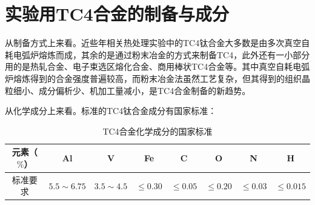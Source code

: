 \documentclass[
class = book,
zihao = -4,
font = noto,
paper = a4paper,
openany
]{easybook}
\begin{document}
\section{实验用TC4合金的制备与成分}
从制备方式上来看。近些年相关热处理实验中的TC4钛合金大多数是由{多次真空自耗电弧炉熔炼}\cite{renchiqiangGurongshixiaoduiTC4taihejinxianweizuzhihelixuexingnengdeyingxiang2022,ranxingGurongwenduduiTi6Al4VELItaihejinxianweizuzhijixingnengdeyingxiang2021,lilouGurongshixiaoduiTC4hejinzuzhiyujixiexingnengdeyingxiang2014,jingranGurongshixiaoduiTC4hejinzuzhiyuxingnengdeyingxiang2018}而成，其余的是通过粉末冶金\cite{zhanghaoyinGurongShixiaoduiTC4taihejinzuzhihelixuexingnengdeyingxiang2014,xujianGurongshixiaogongyiduiTC4taihejinzuzhijixingnengdeyingxiang2014}的方式来制备TC4，此外还有一小部分用的是热轧合金\cite{LiuWanYingBuTongReChuLiGongYiDuiTi6Al4VTaiHeJinWeiGuanJieGouHeLiXueXingNengYingXiangYingWen2017}、电子束选区熔化合金\cite{leijunleDianzishuxuanquronghuachengxingTC4hejinxianweizuzhiyuxingnengdeyanjiujinzhan2022}、商用棒状TC4合金\cite{luyuanyuanShixiaochuliduiTC4taihejinweiguanzuzhihelixuexingnengdeyingxiang2019}等。其中真空自耗电弧炉熔炼得到的合金强度普遍较高，而粉末冶金法虽然工艺复杂，但其得到的组织晶粒细小、成分偏析少、机加工量减小，是TC4合金制备的新趋势。

从化学成分上来看。标准的TC4钛合金成分有国家标准：
\begin{table}[htbp]
	\centering
	\label{sec:mytc4chem}
	\caption{TC4合金化学成分的国家标准}
	\begin{tabular}{cccccccc}
		\toprule
		元素（$ \% $） & Al & V &Fe &C& O& N &H \\ \midrule
		标准要求 &$ 5.5\sim 6.75 $ & $ 3.5\sim 4.5 $&$ \le 0.30 $ & $ \le 0.05 $&$ \le 0.20 $&$ \le 0.03$ &$ \le 0.015 $  \\ \bottomrule
	\end{tabular}
\end{table}
\end{document}
